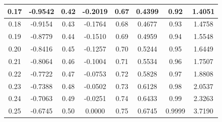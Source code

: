 \documentclass[10pt,letterpaper]{article}
\begin{document}
\begin{table}[h]
{\begin{tabular}{|c|c|c|c|c|c|c|c|}
0.17&-0.9542&0.42&-0.2019&0.67&0.4399&0.92&1.4051\\\hline
0.18&-0.9154&0.43&-0.1764&0.68&0.4677&0.93&1.4758\\\hline
0.19&-0.8779&0.44&-0.1510&0.69&0.4959&0.94&1.5548\\\hline
0.20&-0.8416&0.45&-0.1257&0.70&0.5244&0.95&1.6449\\\hline
0.21&-0.8064&0.46&-0.1004&0.71&0.5534&0.96&1.7507\\\hline
0.22&-0.7722&0.47&-0.0753&0.72&0.5828&0.97&1.8808\\\hline
0.23&-0.7388&0.48&-0.0502&0.73&0.6128&0.98&2.0537\\\hline
0.24&-0.7063&0.49&-0.0251&0.74&0.6433&0.99&2.3263\\\hline
0.25&-0.6745&0.50&0.0000&0.75&0.6745&0.9999&3.7190\\\hline
\end{tabular}
}
\end{table}
\end{document}
